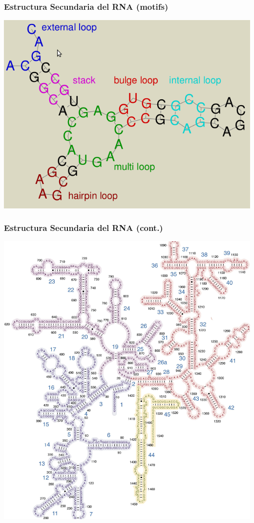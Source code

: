     \begin{frame}\frametitle{\textbf{Estructura Secundaria del RNA (motifs)}}
        \begin{center}
          \includegraphics[scale=.38]{images/rnaMotifs.png}
        \end{center}       
    \end{frame}

    \begin{frame}\frametitle{\textbf{Estructura Secundaria del RNA (cont.)}}
        \begin{center}
          \includegraphics[scale=.39, angle=90]{images/complex.jpg}
        \end{center}       
    \end{frame}


